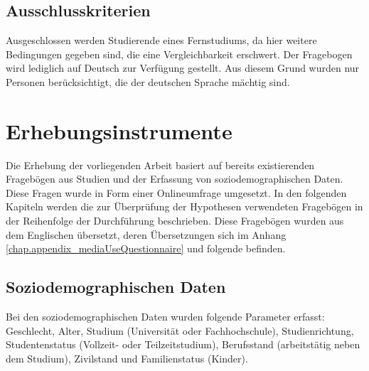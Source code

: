 \subsection{Ausschlusskriterien}\label{subsection.ausschlusskriterien}
Ausgeschlossen werden Studierende eines Fernstudiums, da hier weitere Bedingungen gegeben sind, die eine Vergleichbarkeit erschwert. Der Fragebogen wird lediglich auf Deutsch zur Verfügung gestellt. Aus diesem Grund wurden nur Personen berücksichtigt, die der deutschen Sprache mächtig sind. 

\section{Erhebungsinstrumente}\label{section.erhebungsinstrumente}
Die Erhebung der vorliegenden Arbeit basiert auf bereits existierenden Fragebögen aus Studien und der Erfassung von soziodemographischen Daten. Diese Fragen wurde in Form einer Onlineumfrage umgesetzt. In den folgenden Kapiteln werden die zur Überprüfung der Hypothesen verwendeten Fragebögen in der Reihenfolge der Durchführung beschrieben. Diese Fragebögen wurden aus dem Englischen übersetzt, deren Übersetzungen sich im Anhang \ref{chap.appendix_mediaUseQuestionnaire} und folgende befinden.

\subsection{Soziodemographischen Daten}\label{subsection.soziDaten}
Bei den soziodemographischen Daten wurden folgende Parameter erfasst: Geschlecht, Alter, Studium (Universität oder Fachhochschule), Studienrichtung, Studentenstatus (Vollzeit- oder Teilzeitstudium), Berufsstand (arbeitstätig neben dem Studium), Zivilstand und Familienstatus (Kinder). \\

